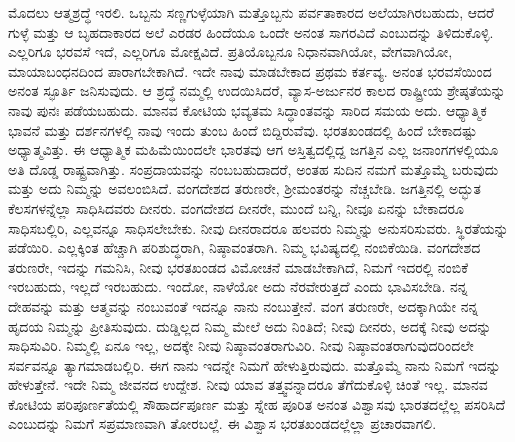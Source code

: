 ಮೊದಲು ಆತ್ಮಶ್ರದ್ಧೆ ಇರಲಿ. ಒಬ್ಬನು ಸಣ್ಣಗುಳ್ಳೆಯಾಗಿ ಮತ್ತೊಬ್ಬನು ಪರ್ವತಾಕಾರದ ಅಲೆಯಾಗಿರಬಹುದು, ಆದರೆ ಗುಳ್ಳೆ ಮತ್ತು ಆ ಬೃಹದಾಕಾರದ ಅಲೆ ಎರಡರ ಹಿಂದೆಯೂ ಒಂದೇ ಅನಂತ ಸಾಗರವಿದೆ ಎಂಬುದನ್ನು ತಿಳಿದುಕೊಳ್ಳಿ. ಎಲ್ಲರಿಗೂ ಭರವಸೆ ಇದೆ, ಎಲ್ಲರಿಗೂ ಮೋಕ್ಷವಿದೆ. ಪ್ರತಿಯೊಬ್ಬನೂ ನಿಧಾನವಾಗಿಯೋ, ವೇಗವಾಗಿಯೋ, ಮಾಯಾಬಂಧನದಿಂದ ಪಾರಾಗಬೇಕಾಗಿದೆ. ಇದೇ ನಾವು ಮಾಡಬೇಕಾದ ಪ್ರಥಮ ಕರ್ತವ್ಯ. ಅನಂತ ಭರವಸೆಯಿಂದ ಅನಂತ ಸ್ಫೂರ್ತಿ ಜನಿಸುವುದು. ಆ ಶ್ರದ್ಧೆ ನಮ್ಮಲ್ಲಿ ಉದಯಿ\-ಸಿದರೆ, ವ್ಯಾಸ-ಅರ್ಜುನರ ಕಾಲದ ರಾಷ್ಟ್ರೀಯ ಶ್ರೇಷ್ಠತೆಯನ್ನು ನಾವು ಪುನಃ ಪಡೆಯಬಹುದು. ಮಾನವ ಕೋಟಿಯ ಭವ್ಯತಮ ಸಿದ್ಧಾಂತವನ್ನು ಸಾರಿದ ಸಮಯ ಅದು. ಆಧ್ಯಾತ್ಮಿಕ ಭಾವನೆ ಮತ್ತು ದರ್ಶನಗಳಲ್ಲಿ ನಾವು ಇಂದು ತುಂಬ ಹಿಂದೆ ಬಿದ್ದಿರುವೆವು. ಭರತಖಂಡದಲ್ಲಿ ಹಿಂದೆ ಬೇಕಾದಷ್ಟು ಅಧ್ಯಾತ್ಮವಿತ್ತು. ಈ ಆಧ್ಯಾತ್ಮಿಕ ಮಹಿಮೆಯಿಂದಲೇ ಭಾರತವು ಆಗ ಅಸ್ತಿತ್ವದಲ್ಲಿದ್ದ ಜಗತ್ತಿನ ಎಲ್ಲ ಜನಾಂಗಗಳಲ್ಲಿಯೂ ಅತಿ ದೊಡ್ಡ ರಾಷ್ಟ್ರವಾಗಿತ್ತು. ಸಂಪ್ರದಾಯವನ್ನು ನಂಬಬಹುದಾದರೆ, ಅಂತಹ ಸುದಿನ ನಮಗೆ ಮತ್ತೊಮ್ಮೆ ಬರುವುದು ಮತ್ತು ಅದು ನಿಮ್ಮನ್ನು ಅವಲಂಬಿಸಿದೆ. ವಂಗದೇಶದ ತರುಣರೇ, ಶ‍್ರೀಮಂತರನ್ನು ನೆಚ್ಚಬೇಡಿ. ಜಗತ್ತಿನಲ್ಲಿ ಅದ್ಭುತ ಕೆಲಸಗಳನ್ನೆಲ್ಲಾ ಸಾಧಿಸಿದವರು ದೀನರು. ವಂಗದೇಶದ ದೀನರೇ, ಮುಂದೆ ಬನ್ನಿ, ನೀವೂ ಏನನ್ನು ಬೇಕಾದರೂ ಸಾಧಿಸಬಲ್ಲಿರಿ, ಎಲ್ಲವನ್ನೂ ಸಾಧಿಸಲೇಬೇಕು. ನೀವು ದೀನರಾದರೂ ಹಲವರು ನಿಮ್ಮನ್ನು ಅನುಸರಿಸುವರು. ಸ್ಥಿರತೆಯನ್ನು ಪಡೆಯಿರಿ. ಎಲ್ಲಕ್ಕಿಂತ ಹೆಚ್ಚಾಗಿ ಪರಿಶುದ್ಧರಾಗಿ, ನಿಷ್ಠಾವಂತರಾಗಿ. ನಿಮ್ಮ ಭವಿಷ್ಯದಲ್ಲಿ ನಂಬಿಕೆಯಿಡಿ. ವಂಗದೇಶದ ತರುಣರೇ, ಇದನ್ನು ಗಮನಿಸಿ, ನೀವು ಭರತಖಂಡದ ವಿಮೋಚನೆ ಮಾಡಬೇಕಾಗಿದೆ, ನಿಮಗೆ ಇದರಲ್ಲಿ ನಂಬಿಕೆ ಇರಬಹುದು, ಇಲ್ಲದೆ ಇರಬಹುದು. ಇಂದೋ, ನಾಳೆಯೋ ಅದು ನೆರವೇರುತ್ತದೆ ಎಂದು ಭಾವಿಸಬೇಡಿ. ನನ್ನ ದೇಹವನ್ನು ಮತ್ತು ಆತ್ಮವನ್ನು ನಂಬುವಂತೆ ಇದನ್ನೂ ನಾನು ನಂಬುತ್ತೇನೆ. ವಂಗ ತರುಣರೇ, ಅದಕ್ಕಾಗಿಯೇ ನನ್ನ ಹೃದಯ ನಿಮ್ಮನ್ನು ಪ್ರೀತಿಸುವುದು. ದುಡ್ಡಿಲ್ಲದ ನಿಮ್ಮ ಮೇಲೆ ಅದು ನಿಂತಿದೆ; ನೀವು ದೀನರು, ಅದಕ್ಕೆ ನೀವು ಅದನ್ನು ಸಾಧಿಸುವಿರಿ. ನಿಮ್ಮಲ್ಲಿ ಏನೂ ಇಲ್ಲ, ಅದಕ್ಕೇ ನೀವು ನಿಷ್ಠಾವಂತರಾಗುವಿರಿ. ನೀವು ನಿಷ್ಠಾವಂತರಾಗುವುದರಿಂದಲೇ ಸರ್ವವನ್ನೂ ತ್ಯಾಗಮಾಡಬಲ್ಲಿರಿ. ಈಗ ನಾನು ಇದನ್ನೇ ನಿಮಗೆ ಹೇಳುತ್ತಿರುವುದು. ಮತ್ತೊಮ್ಮೆ ನಾನು ನಿಮಗೆ ಇದನ್ನು ಹೇಳುತ್ತೇನೆ. ಇದೇ ನಿಮ್ಮ ಜೀವನದ ಉದ್ದೇಶ. ನೀವು ಯಾವ ತತ್ತ್ವವನ್ನಾದರೂ ತೆಗೆದುಕೊಳ್ಳಿ ಚಿಂತೆ ಇಲ್ಲ. ಮಾನವ ಕೋಟಿಯ ಪರಿಪೂರ್ಣತೆಯಲ್ಲಿ ಸೌಹಾರ್ದಪೂರ್ಣ ಮತ್ತು ಸ್ನೇಹ ಪೂರಿತ ಅನಂತ ವಿಶ್ವಾಸವು ಭಾರತದಲ್ಲೆಲ್ಲ ಪಸರಿಸಿದೆ ಎಂಬುದನ್ನು ನಿಮಗೆ ಸಪ್ರಮಾಣವಾಗಿ ತೋರಬಲ್ಲೆ. ಈ ವಿಶ್ವಾಸ ಭರತಖಂಡದಲ್ಲೆಲ್ಲಾ ಪ್ರಚಾರವಾಗಲಿ.

